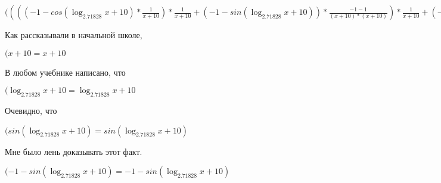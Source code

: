 \documentclass[12pt,a4paper,fleqn]{article}
\theoremstyle{definition}
\begin{document}
$(((( -1  - cos(\log_{ 2.71828 }{ x  +  10 }) * \frac{ 1 }{ x  +  10 }
) * \frac{ 1 }{ x  +  10 }
 + ( -1  - sin(\log_{ 2.71828 }{ x  +  10 })) * \frac{ -1  -  1 }{( x  +  10 ) * ( x  +  10 )}
) * \frac{ 1 }{ x  +  10 }
 + ( -1  - sin(\log_{ 2.71828 }{ x  +  10 })) * \frac{ 1 }{ x  +  10 }
 * \frac{ -1  -  1 }{( x  +  10 ) * ( x  +  10 )}
 + ( -1  - sin(\log_{ 2.71828 }{ x  +  10 })) * \frac{ 1 }{ x  +  10 }
 * \frac{ -2 }{( x  +  10 ) * ( x  +  10 )}
 + cos(\log_{ 2.71828 }{ x  +  10 }) * \frac{ -1  -  -2  * ( x  +  10  +  x  +  10 )}{( x  +  10 ) * ( x  +  10 ) * ( x  +  10 ) * ( x  +  10 )}
) * { 3 }^{sin(\log_{ 2.71828 }{ x  +  10 })} + (( -1  - sin(\log_{ 2.71828 }{ x  +  10 })) * \frac{ 1 }{ x  +  10 }
 * \frac{ 1 }{ x  +  10 }
 + cos(\log_{ 2.71828 }{ x  +  10 }) * \frac{ -2 }{( x  +  10 ) * ( x  +  10 )}
) * cos(\log_{ 2.71828 }{ x  +  10 }) * \frac{ 1 }{ x  +  10 }
 * { 3 }^{sin(\log_{ 2.71828 }{ x  +  10 })} = ((( -1  - cos(\log_{ 2.71828 }{ x  +  10 }) * \frac{ 1 }{ x  +  10 }
) * \frac{ 1 }{ x  +  10 }
 + ( -1  - sin(\log_{ 2.71828 }{ x  +  10 })) * \frac{ -1  -  1 }{( x  +  10 ) * ( x  +  10 )}
) * \frac{ 1 }{ x  +  10 }
 + ( -1  - sin(\log_{ 2.71828 }{ x  +  10 })) * \frac{ 1 }{ x  +  10 }
 * \frac{ -1  -  1 }{( x  +  10 ) * ( x  +  10 )}
 + ( -1  - sin(\log_{ 2.71828 }{ x  +  10 })) * \frac{ 1 }{ x  +  10 }
 * \frac{ -2 }{( x  +  10 ) * ( x  +  10 )}
 + cos(\log_{ 2.71828 }{ x  +  10 }) * \frac{ -1  -  -2  * ( x  +  10  +  x  +  10 )}{( x  +  10 ) * ( x  +  10 ) * ( x  +  10 ) * ( x  +  10 )}
) * { 3 }^{sin(\log_{ 2.71828 }{ x  +  10 })} + (( -1  - sin(\log_{ 2.71828 }{ x  +  10 })) * \frac{ 1 }{ x  +  10 }
 * \frac{ 1 }{ x  +  10 }
 + cos(\log_{ 2.71828 }{ x  +  10 }) * \frac{ -2 }{( x  +  10 ) * ( x  +  10 )}
) * cos(\log_{ 2.71828 }{ x  +  10 }) * \frac{ 1 }{ x  +  10 }
 * { 3 }^{sin(\log_{ 2.71828 }{ x  +  10 })}$

Как рассказывали в начальной школе,

$( x  +  10  =  x  +  10 $

В любом учебнике написано, что

$(\log_{ 2.71828 }{ x  +  10 } = \log_{ 2.71828 }{ x  +  10 }$

Очевидно, что

$(sin(\log_{ 2.71828 }{ x  +  10 }) = sin(\log_{ 2.71828 }{ x  +  10 })$

Мне было лень доказывать этот факт.

$( -1  - sin(\log_{ 2.71828 }{ x  +  10 }) =  -1  - sin(\log_{ 2.71828 }{ x  +  10 })$
\end{document}
